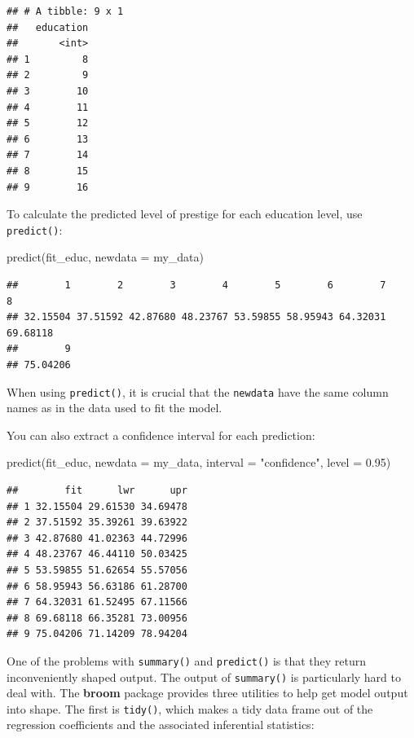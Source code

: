 \documentclass[
  12pt,
  oneside,openany]{book}
\newenvironment{Shaded}{\begin{snugshade}}{\end{snugshade}}
\newcommand{\AttributeTok}[1]{\textcolor[rgb]{0.77,0.63,0.00}{#1}}
\newcommand{\FloatTok}[1]{\textcolor[rgb]{0.00,0.00,0.81}{#1}}
\newcommand{\FunctionTok}[1]{\textcolor[rgb]{0.00,0.00,0.00}{#1}}
\newcommand{\NormalTok}[1]{#1}
\newcommand{\StringTok}[1]{\textcolor[rgb]{0.31,0.60,0.02}{#1}}
\begin{document}
\begin{verbatim}
## # A tibble: 9 x 1
##   education
##       <int>
## 1         8
## 2         9
## 3        10
## 4        11
## 5        12
## 6        13
## 7        14
## 8        15
## 9        16
\end{verbatim}

To calculate the predicted level of prestige for each education level, use \texttt{predict()}:

\begin{Shaded}
\begin{Highlighting}[]
\FunctionTok{predict}\NormalTok{(fit\_educ, }\AttributeTok{newdata =}\NormalTok{ my\_data)}
\end{Highlighting}
\end{Shaded}

\begin{verbatim}
##        1        2        3        4        5        6        7        8 
## 32.15504 37.51592 42.87680 48.23767 53.59855 58.95943 64.32031 69.68118 
##        9 
## 75.04206
\end{verbatim}

When using \texttt{predict()}, it is crucial that the \texttt{newdata} have the same column names as in the data used to fit the model.

You can also extract a confidence interval for each prediction:

\begin{Shaded}
\begin{Highlighting}[]
\FunctionTok{predict}\NormalTok{(fit\_educ,}
        \AttributeTok{newdata =}\NormalTok{ my\_data,}
        \AttributeTok{interval =} \StringTok{"confidence"}\NormalTok{,}
        \AttributeTok{level =} \FloatTok{0.95}\NormalTok{)}
\end{Highlighting}
\end{Shaded}

\begin{verbatim}
##        fit      lwr      upr
## 1 32.15504 29.61530 34.69478
## 2 37.51592 35.39261 39.63922
## 3 42.87680 41.02363 44.72996
## 4 48.23767 46.44110 50.03425
## 5 53.59855 51.62654 55.57056
## 6 58.95943 56.63186 61.28700
## 7 64.32031 61.52495 67.11566
## 8 69.68118 66.35281 73.00956
## 9 75.04206 71.14209 78.94204
\end{verbatim}

One of the problems with \texttt{summary()} and \texttt{predict()} is that they return inconveniently shaped output. The output of \texttt{summary()} is particularly hard to deal with. The \textbf{broom} package provides three utilities to help get model output into shape. The first is \texttt{tidy()}, which makes a tidy data frame out of the regression coefficients and the associated inferential statistics:
\end{document}
